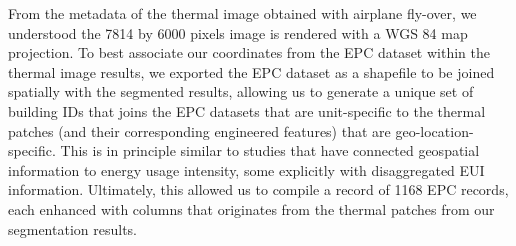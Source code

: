 \documentclass[preprint,12pt]{elsarticle}
\begin{document}
        From the metadata of the thermal image obtained with airplane fly-over, we understood the 7814 by 6000 pixels image is rendered with a WGS 84 map projection. To best associate our coordinates from the EPC dataset within the thermal image results, we exported the EPC dataset as a shapefile to be joined spatially with the segmented results, allowing us to generate a unique set of building IDs that joins the EPC datasets that are unit-specific to the thermal patches (and their corresponding engineered features) that are geo-location-specific. This is in principle similar to studies that have connected geospatial information to energy usage intensity\cite{lin_using_2017}, some explicitly with disaggregated EUI information\cite{samadi_energy_2021}. Ultimately, this allowed us to compile a record of 1168 EPC records, each enhanced with columns that originates from the thermal patches from our segmentation results.      

    
\end{document}
